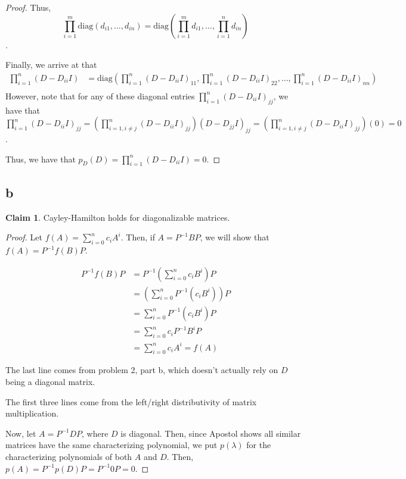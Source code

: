 \documentclass[12pt,letterpaper]{article}
\theoremstyle{definition}
\newtheorem*{claim}{Claim}
\newcommand{\diag}{\mathrm{diag}}
\begin{document}
\begin{proof}
  Thus,
  \[\prod_{i=1}^m\diag(d_{i1}, \dots, d_{in}) =
    \diag(\prod_{i=1}^md_{i1}, \dots, \prod_{i=1}^nd_{in})\].

  Finally, we arrive at that
  \begin{align*}
    \prod_{i=1}^n(D - D_{ii}I) &= \diag(\prod_{i=1}^n(D -D_{ii}I)_{11},
                                 \prod_{i=1}^n(D -D_{ii}I)_{22}, \dots, \prod_{i=1}^n(D -D_{ii}I)_{nn}) \\
  \end{align*}
  However, note that for any of these diagonal entries $\prod_{i=1}^n(D
  -D_{ii}I)_{jj}$, we have that $\prod_{i=1}^n(D -D_{ii}I)_{jj} =
  (\prod_{i=1,i\neq j}^n(D -D_{ii}I)_{jj})(D-D_{jj}I)_{jj} =
  (\prod_{i=1,i\neq j}^n(D -D_{ii}I)_{jj})(0) = 0$.

  Thus, we have that $p_D(D) = \prod_{i=1}^n(D - D_{ii}I) = 0$.
\end{proof}


\subsection*{b}

\begin{claim}
  Cayley-Hamilton holds for diagonalizable matrices.
\end{claim}

\begin{proof}
  Let $f(A) = \sum_{i=0}^nc_iA^i$. Then, if $A = P^{-1}BP$, we will show that
  $f(A) = P^{-1}f(B)P$.

  \begin{align*}
    P^{-1}f(B)P &= P^{-1}(\sum_{i=0}^nc_iB^i)P \\
                &= (\sum_{i=0}^nP^{-1}(c_iB^i))P \\
                &= \sum_{i=0}^nP^{-1}(c_iB^i)P \\
                &= \sum_{i=0}^nc_iP^{-1}B^iP \\
                &= \sum_{i=0}^nc_iA^i = f(A)
  \end{align*}

  The last line comes from problem 2, part b, which doesn't actually rely on $D$
  being a diagonal matrix.

  The first three lines come from the left/right distributivity of matrix multiplication.

  Now, let $A = P^{-1}DP$, where $D$ is diagonal. Then, since Apostol shows all
  similar matrices have the same characterizing polynomial, we put $p(\lambda)$
  for the characterizing polynomials of both $A$ and $D$. Then, $p(A) =
  P^{-1}p(D)P = P^{-1}0P = 0$.
\end{proof}
\end{document}
